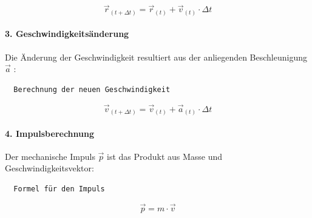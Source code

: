 \documentclass[11pt]{article}
\begin{document}
\[
       \vec{r}_{(t + \Delta t)} = \vec{r}_{(t)} + \vec{v}_{(t)} \cdot \Delta t
\]

\paragraph{3.
Geschwindigkeitsänderung}\label{geschwindigkeitsuxe4nderung}

Die Änderung der Geschwindigkeit resultiert aus der anliegenden
Beschleunigung \(\vec{a}\) \cite{quelle5}:

\begin{verbatim}
  Berechnung der neuen Geschwindigkeit
\end{verbatim}

\[
       \vec{v}_{(t + \Delta t)} = \vec{v}_{(t)} + \vec{a}_{(t)} \cdot \Delta t
\]

\paragraph{4. Impulsberechnung}\label{impulsberechnung}

Der mechanische Impuls \(\vec{p}\) ist das Produkt aus Masse und
Geschwindigkeitsvektor:\\

\begin{verbatim}
  Formel für den Impuls
\end{verbatim}

\[
       \vec{p} = m \cdot \vec{v}
\]
\end{document}
